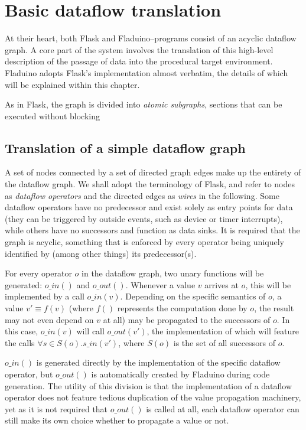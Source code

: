 \documentclass[a4paper,oneside, draft]{memoir}
\begin{document}
\section{Basic dataflow translation}

At their heart, both Flask and Fladuino--programs consist of an
acyclic dataflow graph.  A core part of the system involves the
translation of this high-level description of the passage of data into
the procedural target environment.  Fladuino adopts Flask's
implementation almost verbatim, the details of which will be explained
within this chapter.

As in Flask, the graph is divided into \textit{atomic subgraphs},
sections that can be executed without blocking

\subsection{Translation of a simple dataflow graph}

A set of nodes connected by a set of directed graph edges make up the
entirety of the dataflow graph.  We shall adopt the terminology of
Flask, and refer to nodes as \textit{dataflow operators} and the
directed edges as \textit{wires} in the following.  Some dataflow
operators have no predecessor and exist solely as entry points for
data (they can be triggered by outside events, such as device or timer
interrupts), while others have no successors and function as data
sinks.  It is required that the graph is acyclic, something that is
enforced by every operator being uniquely identified by (among other
things) its predecessor(s).

For every operator $o$ in the dataflow graph, two unary functions will
be generated: $o\_in()$ and $o\_out()$.  Whenever a value $v$ arrives
at $o$, this will be implemented by a call $o\_in(v)$.  Depending on
the specific semantics of $o$, a value $v'\equiv f(v)$ (where $f()$
represents the computation done by $o$, the result may not even depend
on $v$ at all) may be propagated to the successors of $o$.  In this
case, $o\_in(v)$ will call $o\_out(v')$, the implementation of which
will feature the calls $\forall s \in S(o). s\_in(v')$, where $S(o)$
is the set of all successors of $o$.

$o\_in()$ is generated directly by the implementation of the specific
dataflow operator, but $o\_out()$ is automatically created by Fladuino
during code generation.  The utility of this division is that the
implementation of a dataflow operator does not feature tedious
duplication of the value propagation machinery, yet as it is not
required that $o\_out()$ is called at all, each dataflow operator can
still make its own choice whether to propagate a value or not.
\end{document}
